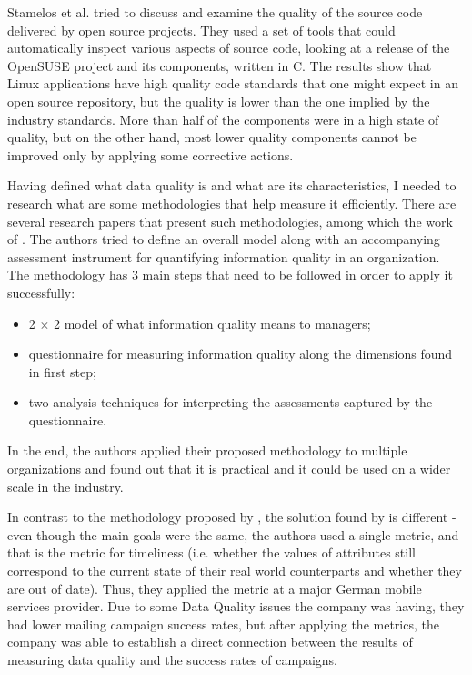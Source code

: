 \documentclass[11pt,english,twocolumn]{article}
\begin{document}
Stamelos et al. \cite{stamelos2002code} tried to discuss and examine the quality
of the source code delivered by open source projects. They used a set of tools
that could automatically inspect various aspects of source code, looking at
a release of the OpenSUSE project and its components, written in C.
The results show that Linux applications have high quality 
code standards that one might expect in an open source repository, but 
the quality is lower than the one implied by the industry standards. More than half
of the components were in a high state of quality, but on the other hand, 
most lower quality components cannot be improved only by applying some
corrective actions. 

Having defined what data quality is and what are its characteristics, I needed
to research what are some methodologies that help measure it efficiently.
There are several research papers that present such methodologies, among which the 
work of \cite{lee2002aimq}. The authors tried to define an overall model along 
with an accompanying assessment instrument for quantifying information quality 
in an organization. The methodology has 3 main steps that need to be followed 
in order to apply it successfully:
  \begin{itemize}
    \item 2 $\times$ 2 model of what information quality means to managers;
    \item questionnaire for measuring information quality along the dimensions
    found in first step;
    \item two analysis techniques for interpreting the assessments captured 
    by the questionnaire.
  \end{itemize} 
In the end, the authors applied their proposed methodology to multiple organizations
and found out that it is practical and it could be used on a wider scale in the 
industry.

In contrast to the methodology proposed by \cite{lee2002aimq}, the solution found
by \cite{Heinrich2007MetricsDataQuality} is different - even though the 
main goals were the same, the authors used a single metric, and that is 
the metric for timeliness (i.e. whether the values of attributes still 
correspond to the current state of their real world counterparts and whether 
they are out of date). Thus, they applied the metric at a major German mobile 
services provider. Due to some Data Quality issues the company was having, they 
had lower mailing campaign success rates, but after applying the metrics, the 
company was able to establish a direct connection between the results of
measuring data quality and the success rates of campaigns.
\end{document}
